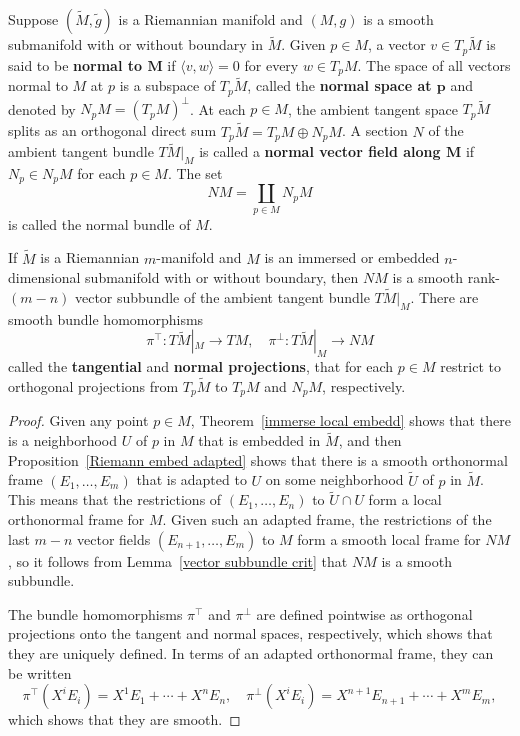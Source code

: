 Suppose $(\widetilde{M},\widetilde{g})$ is a Riemannian manifold and $(M,g)$ is a smooth submanifold 
with or without boundary in $\widetilde{M}$. Given $p\in M$, a vector $v\in T_p\widetilde{M}$ is said to be
\textbf{normal to $\bm{M}$} if $\langle v,w\rangle=0$ for every $w\in T_pM$. The space of all vectors 
normal to $M$ at $p$ is a subspace of $T_p\widetilde{M}$, called the \textbf{normal space at $\bm{p}$} and 
denoted by $N_pM=(T_pM)^{\bot}$. At each $p\in M$, the ambient tangent space $T_p\widetilde{M}$ splits as an 
orthogonal direct sum $T_p\widetilde{M}=T_pM\oplus N_pM$. A section $N$ of the ambient tangent bundle 
$T\widetilde{M}|_{M}$ is called a \textbf{normal vector field along $\bm{M}$} if $N_p\in N_pM$ for each $p\in M$. The set
\[NM=\coprod_{p\in M}N_pM\]
is called the normal bundle of $M$.
\begin{proposition}\label{Riemann normal bundle}
If $\widetilde{M}$ is a Riemannian $m$-manifold and $M$ is an immersed or embedded $n$-dimensional 
submanifold with or without boundary, then $NM$ is a smooth rank-$(m-n)$ vector subbundle of the ambient 
tangent bundle $T\widetilde{M}|_M$. There are smooth bundle homomorphisms
\[\pi^{\top}:T\widetilde{M}|_M\to TM,\quad \pi^{\bot}:T\widetilde{M}|_M\to NM\]
called the \textbf{tangential} and \textbf{normal projections}, that for each $p\in M$ restrict to
orthogonal projections from $T_p\widetilde{M}$ to $T_pM$ and $N_pM$, respectively.
\end{proposition}
\begin{proof}
Given any point $p\in M$, Theorem~\ref{immerse local embedd} shows that there is a neighborhood 
$U$ of $p$ in $M$ that is embedded in $\widetilde{M}$, and then Proposition~\ref{Riemann embed adapted} 
shows that there is a smooth orthonormal frame $(E_1,\dots,E_m)$ that is adapted to $U$ on some 
neighborhood $\widetilde{U}$ of $p$ in $\widetilde{M}$. This means that the restrictions of 
$(E_1,\dots,E_n)$ to $\widetilde{U}\cap U$ form a local orthonormal frame for $M$. Given such an 
adapted frame, the restrictions of the last $m-n$ vector fields $(E_{n+1},\dots,E_m)$ to $M$ form 
a smooth local frame for $NM$, so it follows from Lemma~\ref{vector subbundle crit} that $NM$ is a 
smooth subbundle.\par
The bundle homomorphisms $\pi^{\top}$ and $\pi^{\bot}$ are defined pointwise as orthogonal 
projections onto the tangent and normal spaces, respectively, which shows that they are uniquely 
defined. In terms of an adapted orthonormal frame, they can be written
\[\pi^{\top}(X^iE_i)=X^1E_1+\cdots+X^nE_n,\quad \pi^{\bot}(X^iE_i)=X^{n+1}E_{n+1}+\cdots+X^mE_m,\]
which shows that they are smooth.
\end{proof}
